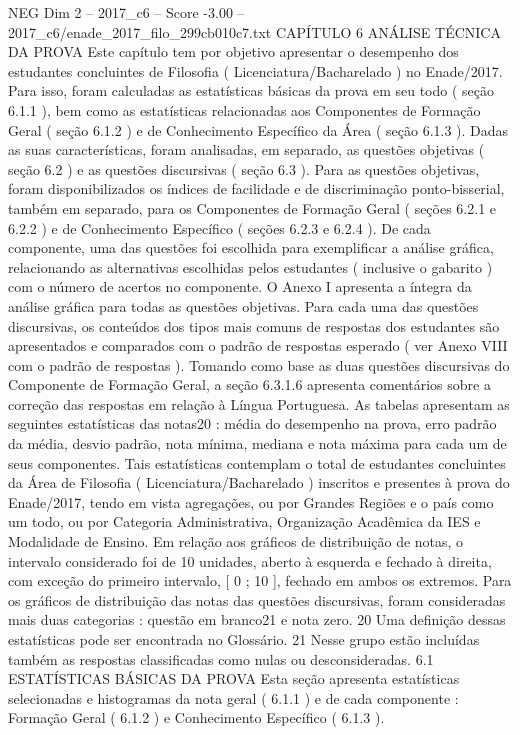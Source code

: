 \begin{textsample}{NEG Dim 2 – 2017\_c6 – Score -3.00 – 2017\_c6/enade\_2017\_filo\_299cb010c7.txt}  \label{ex:f2_neg_163}
CAPÍTULO 6 ANÁLISE TÉCNICA DA PROVA Este capítulo tem por objetivo apresentar o desempenho dos estudantes concluintes de Filosofia ( Licenciatura/Bacharelado ) no Enade/2017.
Para isso, foram calculadas as estatísticas básicas da prova em seu todo ( seção 6.1.1 ), bem como as estatísticas relacionadas aos Componentes de Formação Geral ( seção 6.1.2 ) e de Conhecimento Específico da Área ( seção 6.1.3 ).
Dadas as suas características, foram analisadas, em separado, as questões objetivas ( seção 6.2 ) e as questões discursivas ( seção 6.3 ).
Para as questões objetivas, foram disponibilizados os índices de facilidade e de discriminação ponto-bisserial, também em separado, para os Componentes de Formação Geral ( seções 6.2.1 e 6.2.2 ) e de Conhecimento Específico ( seções 6.2.3 e 6.2.4 ).
De cada componente, uma das questões foi escolhida para exemplificar a análise gráfica, relacionando as alternativas escolhidas pelos estudantes ( inclusive o gabarito ) com o número de acertos no componente.
O Anexo I apresenta a íntegra da análise gráfica para todas as questões objetivas.
Para cada uma das questões discursivas, os conteúdos dos tipos mais comuns de respostas dos estudantes são apresentados e comparados com o padrão de respostas esperado ( ver Anexo VIII com o padrão de respostas ).
Tomando como base as duas questões discursivas do Componente de Formação Geral, a seção 6.3.1.6 apresenta comentários sobre a correção das respostas em relação à Língua Portuguesa.
As tabelas apresentam as seguintes estatísticas das notas20 : média do desempenho na prova, erro padrão da média, desvio padrão, nota mínima, mediana e nota máxima para cada um de seus componentes.
Tais estatísticas contemplam o total de estudantes concluintes da Área de Filosofia ( Licenciatura/Bacharelado ) inscritos e presentes à prova do Enade/2017, tendo em vista agregações, ou por Grandes Regiões e o país como um todo, ou por Categoria Administrativa, Organização Acadêmica da IES e Modalidade de Ensino.
Em relação aos gráficos de distribuição de notas, o intervalo considerado foi de 10 unidades, aberto à esquerda e fechado à direita, com exceção do primeiro intervalo, [ 0 ; 10 ], fechado em ambos os extremos.
Para os gráficos de distribuição das notas das questões discursivas, foram consideradas mais duas categorias : questão em branco21 e nota zero. 20 Uma definição dessas estatísticas pode ser encontrada no Glossário. 21 Nesse grupo estão incluídas também as respostas classificadas como nulas ou desconsideradas. 6.1 ESTATÍSTICAS BÁSICAS DA PROVA Esta seção apresenta estatísticas selecionadas e histogramas da nota geral ( 6.1.1 ) e de cada componente : Formação Geral ( 6.1.2 ) e Conhecimento Específico ( 6.1.3 ).

\end{textsample}
